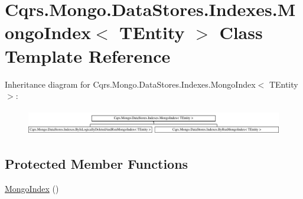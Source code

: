 \hypertarget{classCqrs_1_1Mongo_1_1DataStores_1_1Indexes_1_1MongoIndex}{}\section{Cqrs.\+Mongo.\+Data\+Stores.\+Indexes.\+Mongo\+Index$<$ T\+Entity $>$ Class Template Reference}
\label{classCqrs_1_1Mongo_1_1DataStores_1_1Indexes_1_1MongoIndex}
Inheritance diagram for Cqrs.\+Mongo.\+Data\+Stores.\+Indexes.\+Mongo\+Index$<$ T\+Entity $>$\+:\begin{figure}[H]
\begin{center}
\leavevmode
\includegraphics[height=1.122244cm]{classCqrs_1_1Mongo_1_1DataStores_1_1Indexes_1_1MongoIndex}
\end{center}
\end{figure}
\subsection*{Protected Member Functions}
\begin{DoxyCompactItemize}
\item 
\hyperlink{classCqrs_1_1Mongo_1_1DataStores_1_1Indexes_1_1MongoIndex_a7affbb063520cd8c8bda27f8478efd06_a7affbb063520cd8c8bda27f8478efd06}{Mongo\+Index} ()
\end{DoxyCompactItemize}
